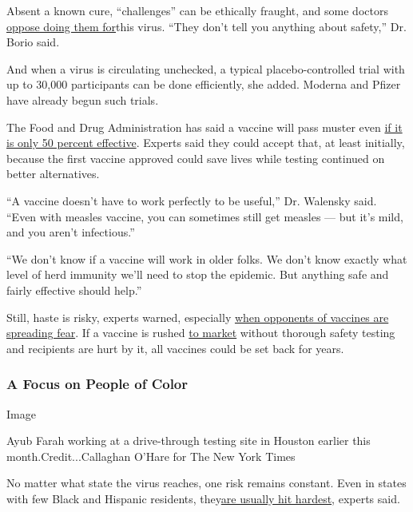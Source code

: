 Absent a known cure, ``challenges'' can be ethically fraught, and some
doctors
\href{https://www.statnews.com/2020/06/23/challenge-trials-live-coronavirus-speedy-covid-19-vaccine/}{oppose
doing them for}this virus. ``They don't tell you anything about
safety,'' Dr. Borio said.

And when a virus is circulating unchecked, a typical placebo-controlled
trial with up to 30,000 participants can be done efficiently, she added.
Moderna and Pfizer have already begun such trials.

The Food and Drug Administration has said a vaccine will pass muster
even
\href{https://www.washingtonpost.com/health/2020/06/30/coronavirus-vaccine-approval-fda/}{if
it is only 50 percent effective}. Experts said they could accept that,
at least initially, because the first vaccine approved could save lives
while testing continued on better alternatives.

``A vaccine doesn't have to work perfectly to be useful,'' Dr. Walensky
said. ``Even with measles vaccine, you can sometimes still get measles
--- but it's mild, and you aren't infectious.''

``We don't know if a vaccine will work in older folks. We don't know
exactly what level of herd immunity we'll need to stop the epidemic. But
anything safe and fairly effective should help.''

Still, haste is risky, experts warned, especially
\href{https://www.nytimes3xbfgragh.onion/2020/07/18/health/coronavirus-anti-vaccine.html}{when
opponents of vaccines are spreading fear}. If a vaccine is rushed
\href{https://www.nytimes3xbfgragh.onion/2020/06/08/opinion/trump-coronavirus-vaccine.html}{to
market} without thorough safety testing and recipients are hurt by it,
all vaccines could be set back for years.

\hypertarget{a-focus-on-people-of-color}{%
\subsubsection{A Focus on People of
Color}\label{a-focus-on-people-of-color}}

Image

Ayub Farah working at a drive-through testing site in Houston earlier
this month.Credit...Callaghan O'Hare for The New York Times

No matter what state the virus reaches, one risk remains constant. Even
in states with few Black and Hispanic residents,
they\href{https://www.cdc.gov/coronavirus/2019-ncov/need-extra-precautions/racial-ethnic-minorities.html}{are
usually hit hardest}, experts said.

